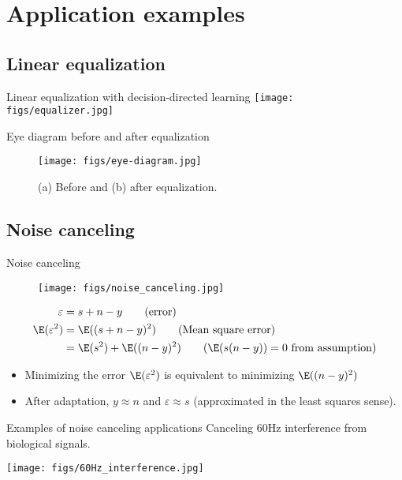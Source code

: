 \documentclass[10pt, aspectratio=169]{beamer}
\begin{document}
\section{Application examples}
\frame{\tableofcontents[currentsection]}

\subsection{Linear equalization}
\begin{frame}{Linear equalization with decision-directed learning}
\centering
\texttt{[image: figs/equalizer.jpg]}
\end{frame}

\begin{frame}{Eye diagram before and after equalization}
	\begin{figure}
		\centering
		\texttt{[image: figs/eye-diagram.jpg]}
		\caption{(a) Before and (b) after equalization.}
	\end{figure}
\end{frame}

\subsection{Noise canceling}
\frame{\tableofcontents[currentsubsection]}
\begin{frame}{Noise canceling}
	\begin{figure}
		\centering
		\texttt{[image: figs/noise\_canceling.jpg]}
	\end{figure}
	\begin{align}
		\varepsilon &= s + n - y \tag{error} \\
		\E(\varepsilon^2) &= \E((s + n - y)^2) \tag{Mean square error} \\
		&= \E(s^2) + \E((n - y)^2) \tag{$\E(s(n-y)) = 0$ from assumption}
	\end{align}
	
	\begin{itemize}
		\item Minimizing the error $\E(\varepsilon^2)$ is equivalent to minimizing $\E((n - y)^2)$ 
		\item After adaptation, $y \approx n$ and $\varepsilon \approx s$ (approximated in the least squares sense).
	\end{itemize} 
\end{frame}

\begin{frame}{Examples of noise canceling applications}
Canceling 60Hz interference from biological signals. 
\begin{center}
	\texttt{[image: figs/60Hz\_interference.jpg]}
\end{center}

\end{frame}
\end{document}

